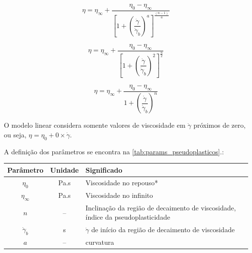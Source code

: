 			\begin{equation}
			\eta = \eta_{\infty} + \frac{\eta_0 - \eta_{\infty}}{\left[  1 + \left(  \dfrac{\dot{\gamma}}{\dot{\gamma}_b}  \right)^{a}  \right]^{\frac{ \left(  n - 1  \right) }{a}}}
			\label{eqn:AP_CarreauYasuda}
			\end{equation}
			
			\begin{equation}
			\eta = \eta_{\infty} + \frac{\eta_0 - \eta_{\infty}}{\left[  1 + \left(  \dfrac{\dot{\gamma}}{\dot{\gamma}_b}  \right)^{2}  \right]^{\frac{n}{2}}}
			\label{eqn:AP_Carreau}
			\end{equation}
			
			\begin{equation}
			\eta = \eta_{\infty} + \frac{\eta_0 - \eta_{\infty}}{1 + \left(  \dfrac{\dot{\gamma}}{\dot{\gamma}_b}  \right)^{n}}
			\label{eqn:AP_Cross}
			\end{equation}
			
			O modelo linear considera somente valores de viscosidade em \(\dot{\gamma}\) próximos de zero, ou seja, \(\eta = \eta_0 + 0 \times \dot{\gamma}\).
			
			A definição dos parâmetros se encontra na \autoref{tab:params_pseudoplasticos}.\cite{WLM_Advances}:
			
			\begin{table}[h]
				{%
					\begin{tabular}{c c p{9cm}}
						\toprule
						Parâmetro      & Unidade   & Significado                                                       \\ \midrule
						\(\eta_0\)     & Pa.s      & Viscosidade no repouso*                                           \\
						\(\eta_{\infty}\)  & Pa.s      & Viscosidade no infinito                                           \\
						\(n\)        & --        & Inclinação da região de decaimento de viscosidade, índice da pseudoplasticidade                 \\
						\(\dot{\gamma}_b\) & s\menosUm & \(\dot{\gamma}\) de início da região de decaimento de viscosidade \\ \midrule
						\(a\)        & --        & curvatura               \\ \bottomrule
					\end{tabular}%
				}{}
			\end{table}
			
